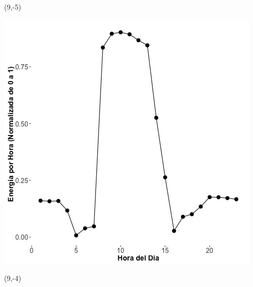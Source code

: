 \documentclass{article}\usepackage[]{graphicx}\usepackage[]{color}
\newenvironment{knitrout}{}{} %
\begin{document}
 \begin{textblock}{1}(9,-5)
\begin{minipage}{20em}
\begingroup

\endgroup
\end{minipage}
\end{textblock}

\begin{knitrout}
\color{fgcolor}
\includegraphics[scale=0.65]{figure/A19_plot_norm_median} 
\end{knitrout}


 \begin{textblock}{1}(9,-4)
\begin{minipage}{20em}
\begingroup

\endgroup
\end{minipage}
\end{textblock}
\end{document}
